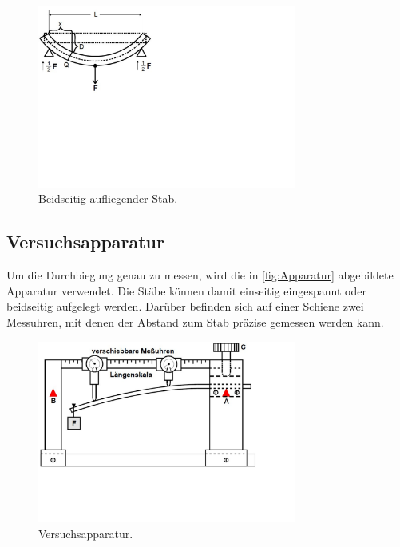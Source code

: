 \begin{figure} [H]
    \centering
    \includegraphics[height=6cm]{content/Abbildungen/stab_beidseitig.pdf}
    \caption{Beidseitig aufliegender Stab. \cite{v103}}
    \label{fig:stab beidseitig}
\end{figure}

\subsection{Versuchsapparatur}
\label{sec:Apparatur}

Um die Durchbiegung genau zu messen, wird die in \autoref{fig:Apparatur} abgebildete Apparatur verwendet.
Die Stäbe können damit einseitig eingespannt oder beidseitig aufgelegt werden.
Darüber befinden sich auf einer Schiene zwei Messuhren, mit denen der Abstand zum Stab präzise gemessen werden kann.

\begin{figure} [H]
    \centering
    \includegraphics[height=6cm]{content/Abbildungen/Apparatur.pdf}
    \caption{Versuchsapparatur. \cite{v103}}
    \label{fig:Apparatur}
\end{figure}